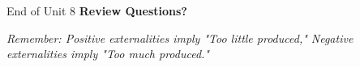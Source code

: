 \documentclass{beamer}
\begin{document}
\begin{frame}{End of Unit 8}
    \centering
    \Large
    \textbf{Review Questions?}
    \vspace{1cm}
    
    \small
    \textit{Remember: Positive externalities imply "Too little produced," Negative externalities imply "Too much produced."}
\end{frame}
\end{document}
